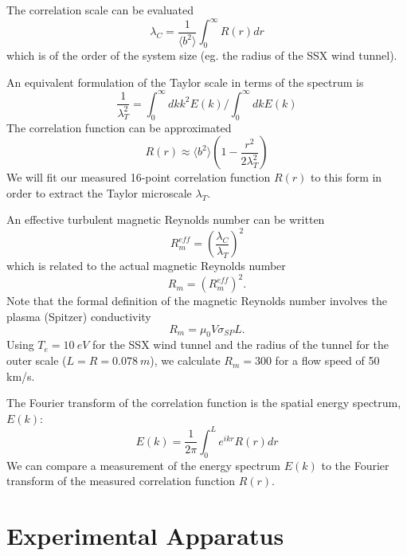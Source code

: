 \documentclass[aip,prl,amsmath,amssymb,reprint,superscriptaddress]{revtex4-1} %
\begin{document}
The correlation scale can be evaluated
%
\begin{equation}
\lambda_{C}  = \frac{1}{\langle b^2 \rangle} \int_0^\infty R(r) dr
\label{eq:tayscale2}
\end{equation}
%
which is of the order of the system size (eg. the radius of the SSX wind tunnel).

An equivalent formulation of the Taylor scale in terms of the spectrum is
%
\begin{equation}
\frac{1}{\lambda_T^2}  = \int_0^\infty dk k^2 E(k)/\int_0^\infty dk E(k)
\label{eq:tayscale3}
\end{equation}
%
The correlation function can be approximated
\begin{equation}
R(r) \approx  \langle b^2 \rangle \left(1 - \frac{r^2}{2 \lambda_T^2}  \right)
\label{eq:correlation2}  
\end{equation}
%
We will fit our measured 16-point correlation function $R(r)$ to this form in order to extract the Taylor microscale $\lambda_T$. 

An effective turbulent magnetic Reynolds number can be written \cite{frisch95}
%
\begin{equation}
R_m^{eff}  = \left(\frac{\lambda_{C}}{\lambda_T} \right)^2
\label{eq:RM-eff}
\end{equation}
%
which is related to the actual magnetic Reynolds number
%
\begin{equation}
R_m  = \left( R_m^{eff} \right) ^2 .
\label{eq:RM-eff2}
\end{equation}
%
Note that the formal definition of the magnetic Reynolds number involves the plasma (Spitzer) conductivity
\begin{equation}
R_m = \mu_0 V \sigma_{SP} L.
\label{eq:RM-calc} 
\end{equation}
%
Using $T_e = 10~eV$ for the SSX wind tunnel and the radius of the tunnel for the outer scale ($L = R = 0.078~m$), we calculate $R_m = 300$ for a flow speed of 50 km/s.

The Fourier transform of the correlation function is the spatial energy spectrum, $E(k)$:
%
\begin{equation}
E(k) = \frac{1}{2 \pi} \int_0^L e^{ikr} R(r) dr
\label{eq:spectrum1}
\end{equation}
%
We can compare a measurement of the energy spectrum $E(k)$ to the Fourier transform of the measured correlation function $R(r)$.

\section{Experimental Apparatus}
\end{document}

